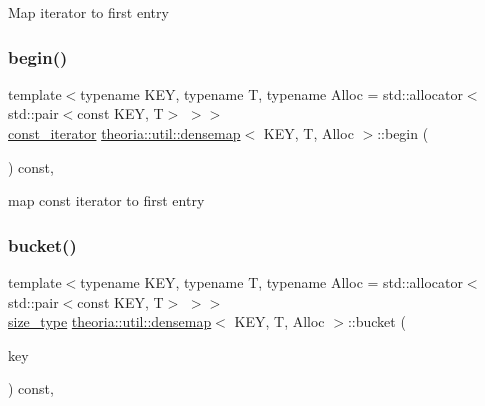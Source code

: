Map iterator to first entry \mbox{\label{classtheoria_1_1util_1_1densemap_a602ddf67e5b8c1dc4459f71a0c7273b5}} 
\subsubsection{\texorpdfstring{begin()}{begin()}\hspace{0.1cm}{\footnotesize\ttfamily [2/2]}}
{\footnotesize\ttfamily template$<$typename K\+EY, typename T, typename Alloc = std\+::allocator$<$std\+::pair$<$const K\+E\+Y, T$>$ $>$$>$ \\
\hyperlink{classtheoria_1_1util_1_1densemap_a8c2937f8e4ba47abf344d9f9f23f0c88}{const\+\_\+iterator} \hyperlink{classtheoria_1_1util_1_1densemap}{theoria\+::util\+::densemap}$<$ K\+EY, T, Alloc $>$\+::begin (\begin{DoxyParamCaption}{ }\end{DoxyParamCaption}) const\hspace{0.3cm}{\ttfamily [inline]}, {\ttfamily [noexcept]}}

map const iterator to first entry \mbox{\label{classtheoria_1_1util_1_1densemap_a10f53552f9f880393cad9085ff9d5a23}} 
\subsubsection{\texorpdfstring{bucket()}{bucket()}}
{\footnotesize\ttfamily template$<$typename K\+EY, typename T, typename Alloc = std\+::allocator$<$std\+::pair$<$const K\+E\+Y, T$>$ $>$$>$ \\
\hyperlink{classtheoria_1_1util_1_1densemap_a133075e61db44e086c734c8a32ca6ab2}{size\+\_\+type} \hyperlink{classtheoria_1_1util_1_1densemap}{theoria\+::util\+::densemap}$<$ K\+EY, T, Alloc $>$\+::bucket (\begin{DoxyParamCaption}\item[{const \hyperlink{classtheoria_1_1util_1_1densemap_afd285a46dc8f45b4b1556a656708d2a7}{key\+\_\+type} \&}]{key }\end{DoxyParamCaption}) const\hspace{0.3cm}{\ttfamily [inline]}, {\ttfamily [noexcept]}}

